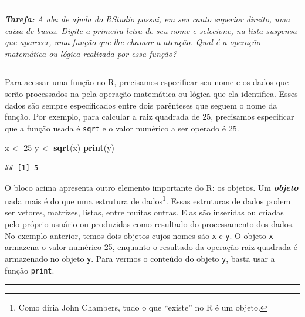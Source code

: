 \documentclass[
]{book}
\newenvironment{Shaded}{\begin{snugshade}}{\end{snugshade}}
\newcommand{\DecValTok}[1]{\textcolor[rgb]{0.00,0.00,0.81}{#1}}
\newcommand{\KeywordTok}[1]{\textcolor[rgb]{0.13,0.29,0.53}{\textbf{#1}}}
\newcommand{\NormalTok}[1]{#1}
\newcommand{\StringTok}[1]{\textcolor[rgb]{0.31,0.60,0.02}{#1}}
\begin{document}
\begin{center}\rule{0.5\linewidth}{0.5pt}\end{center}

\textbf{\emph{Tarefa:}} \emph{A aba de ajuda do RStudio possui, em seu canto superior direito, uma caixa de busca. Digite a primeira letra de seu nome e selecione, na lista suspensa que aparecer, uma função que lhe chamar a atenção. Qual é a operação matemática ou lógica realizada por essa função?}

\begin{center}\rule{0.5\linewidth}{0.5pt}\end{center}

Para acessar uma função no R, precisamos especificar seu nome e os dados que serão processados na pela operação matemática ou lógica que ela identifica. Esses dados são sempre especificados entre dois parênteses que seguem o nome da função. Por exemplo, para calcular a raiz quadrada de 25, precisamos especificar que a função usada é \texttt{sqrt} e o valor numérico a ser operado é 25.

\begin{Shaded}
\begin{Highlighting}[]
\NormalTok{x <-}\StringTok{ }\DecValTok{25}
\NormalTok{y <-}\StringTok{ }\KeywordTok{sqrt}\NormalTok{(x)}
\KeywordTok{print}\NormalTok{(y)}
\end{Highlighting}
\end{Shaded}

\begin{verbatim}
## [1] 5
\end{verbatim}

O bloco acima apresenta outro elemento importante do R: os objetos. Um \textbf{\emph{objeto}} nada mais é do que uma estrutura de dados\footnote{Como diria John Chambers, tudo o que ``existe'' no R é um objeto.}. Essas estruturas de dados podem ser vetores, matrizes, listas, entre muitas outras. Elas são inseridas ou criadas pelo próprio usuário ou produzidas como resultado do processamento dos dados. No exemplo anterior, temos dois objetos cujos nomes são \texttt{x} e \texttt{y}. O objeto \texttt{x} armazena o valor numérico 25, enquanto o resultado da operação raiz quadrada é armazenado no objeto \texttt{y}. Para vermos o conteúdo do objeto \texttt{y}, basta usar a função \texttt{print}.

\begin{center}\rule{0.5\linewidth}{0.5pt}\end{center}
\end{document}
